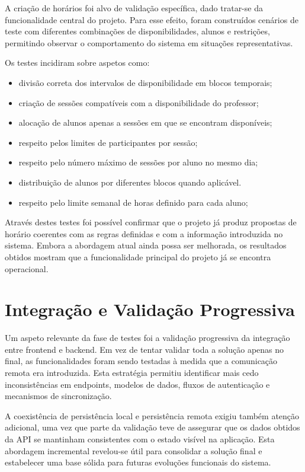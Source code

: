 A criação de horários foi alvo de validação específica, dado tratar-se da funcionalidade central do projeto.
Para esse efeito, foram construídos cenários de teste com diferentes combinações de disponibilidades, alunos e restrições,
permitindo observar o comportamento do sistema em situações representativas.

Os testes incidiram sobre aspetos como:
\begin{itemize}
    \item divisão correta dos intervalos de disponibilidade em blocos temporais;
    \item criação de sessões compatíveis com a disponibilidade do professor;
    \item alocação de alunos apenas a sessões em que se encontram disponíveis;
    \item respeito pelos limites de participantes por sessão;
    \item respeito pelo número máximo de sessões por aluno no mesmo dia;
    \item distribuição de alunos por diferentes blocos quando aplicável.
    \item respeito pelo limite semanal de horas definido para cada aluno;
\end{itemize}

Através destes testes foi possível confirmar que o projeto já produz propostas de horário coerentes com as regras definidas e com a informação introduzida no sistema.
Embora a abordagem atual ainda possa ser melhorada, os resultados obtidos mostram que a funcionalidade principal do projeto já se encontra operacional.

\section{Integração e Validação Progressiva}

Um aspeto relevante da fase de testes foi a validação progressiva da integração entre frontend e backend. Em vez de tentar validar toda a solução apenas no final,
as funcionalidades foram sendo testadas à medida que a comunicação remota era introduzida.
Esta estratégia permitiu identificar mais cedo inconsistências em endpoints, modelos de dados, fluxos de autenticação e mecanismos de sincronização.

A coexistência de persistência local e persistência remota exigiu também atenção adicional, uma vez que parte da validação teve de assegurar que os dados obtidos da API
se mantinham consistentes com o estado visível na aplicação.
Esta abordagem incremental revelou-se útil para consolidar a solução final e estabelecer uma base sólida para futuras evoluções funcionais do sistema.

